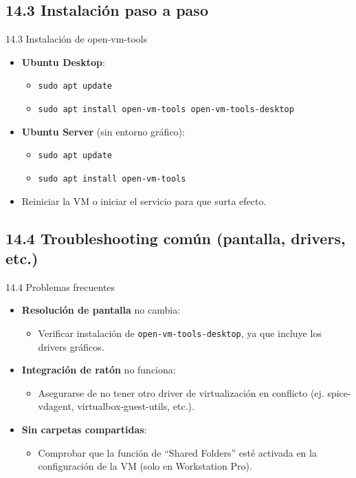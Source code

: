 \documentclass{beamer}
\begin{document}
\subsection{14.3 Instalación paso a paso}
\begin{frame}{14.3 Instalación de open-vm-tools}
    \begin{itemize}
        \item \textbf{Ubuntu Desktop}:
        \begin{itemize}
            \item \texttt{sudo apt update}
            \item \texttt{sudo apt install open-vm-tools open-vm-tools-desktop}
        \end{itemize}
        \item \textbf{Ubuntu Server} (sin entorno gráfico):
        \begin{itemize}
            \item \texttt{sudo apt update}
            \item \texttt{sudo apt install open-vm-tools}
        \end{itemize}
        \item Reiniciar la VM o iniciar el servicio para que surta efecto.
    \end{itemize}
\end{frame}

\subsection{14.4 Troubleshooting común (pantalla, drivers, etc.)}
\begin{frame}{14.4 Problemas frecuentes}
    \begin{itemize}
        \item \textbf{Resolución de pantalla} no cambia:
            \begin{itemize}
                \item Verificar instalación de \texttt{open-vm-tools-desktop}, ya que incluye los drivers gráficos.
            \end{itemize}
        \item \textbf{Integración de ratón} no funciona:
            \begin{itemize}
                \item Asegurarse de no tener otro driver de virtualización en conflicto (ej. spice-vdagent, virtualbox-guest-utils, etc.).
            \end{itemize}
        \item \textbf{Sin carpetas compartidas}:
            \begin{itemize}
                \item Comprobar que la función de “Shared Folders” esté activada en la configuración de la VM (solo en Workstation Pro).
            \end{itemize}
    \end{itemize}
\end{frame}
\end{document}
